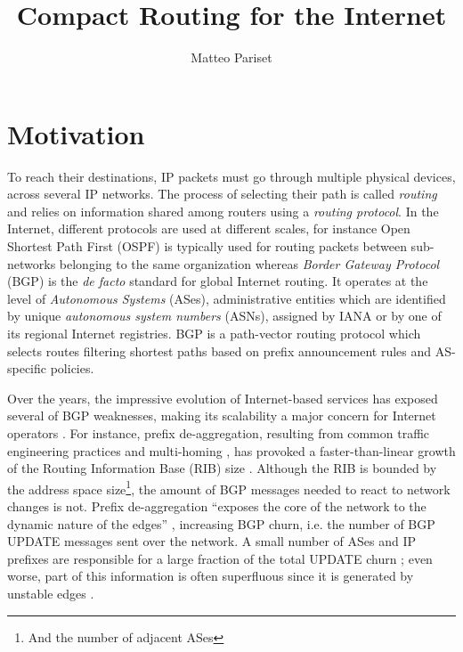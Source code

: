 \documentclass[a4paper,11pt,oneside]{report}
\title{Compact Routing for the Internet}
\author{Matteo Pariset}
\begin{document}
\maketitle


\chapter{Motivation}
To reach their destinations, IP packets must go through multiple physical devices, across several IP networks. The process of selecting their path is called \emph{routing} and relies on information shared among routers using a \emph{routing protocol}. In the Internet, different protocols are used at different scales, for instance Open Shortest Path First (OSPF) is typically used for routing packets between sub-networks belonging to the same organization whereas \emph{Border Gateway Protocol} (BGP) is the \textit{de facto} standard for global Internet routing. It operates at the level of \emph{Autonomous Systems} (ASes), administrative entities which are identified by unique \emph{autonomous system numbers} (ASNs), assigned by IANA or by one of its regional Internet registries.
BGP is a path-vector routing protocol which selects routes filtering shortest paths based on prefix announcement rules and AS-specific policies.

\bigskip
Over the years, the impressive evolution of Internet-based services has exposed several of BGP weaknesses, making its scalability a major concern for Internet operators \cite{elmokashfiScalabilityBGPRole2010}. For instance, prefix de-aggregation, resulting from common traffic engineering practices and multi-homing \cite{dReportIABWorkshop}, has provoked a faster-than-linear growth of the Routing Information Base (RIB) size \cite{Potaroo}. Although the RIB is bounded by the address space size\footnote{And the number of adjacent ASes}, the amount of BGP messages needed to react to network changes is not. Prefix de-aggregation ``exposes the core of the network to the dynamic nature of the edges'' \cite{dReportIABWorkshop}, increasing BGP churn, i.e. the number of BGP UPDATE messages sent over the network. A small number of ASes and IP prefixes are responsible for a large fraction of the total UPDATE churn \cite{BGPchurnCore2012}; even worse, part of this information is often superfluous since it is generated by unstable edges \cite{Oliveira_measurementof}.
\end{document}
